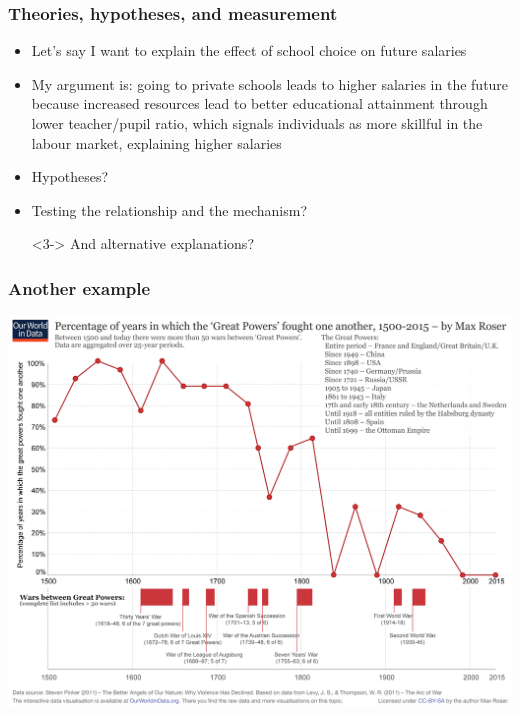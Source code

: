\documentclass[aspectratio=43]{beamer}
\begin{document}
\begin{frame}
\frametitle{Theories, hypotheses, and measurement}
\centering

\begin{itemize}
  \item Let's say I want to explain the effect of school choice on future salaries
  \item My argument is: going to private schools leads to higher salaries in the future because increased resources lead to better educational attainment through lower teacher/pupil ratio, which signals individuals as more skillful in the labour market, explaining higher salaries
  \item[]
  \item<2-> Hypotheses?
  \item<3-> Testing the relationship and the mechanism?
  \item[]<3-> And alternative explanations?
\end{itemize}

\end{frame}

\begin{frame}
\frametitle{Another example}
\centering

\includegraphics[width = \textwidth]{../img/declineofwar}

\end{frame}
\end{document}
